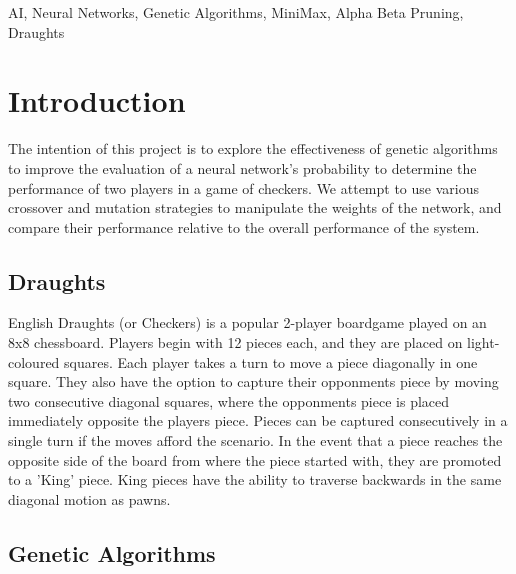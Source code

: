 \documentclass[12pt,a4paper]{article}
\begin{document}
\begin{keywords}
AI, Neural Networks, Genetic Algorithms, MiniMax, Alpha Beta Pruning, Draughts

\end{keywords}





\section{Introduction}
The intention of this project is to explore the effectiveness of genetic algorithms to improve the evaluation of a neural network's probability to determine the performance of two players in a game of checkers. We attempt to use various crossover and mutation strategies to manipulate the weights of the network, and compare their performance relative to the overall performance of the system.

\subsection*{Draughts}

English Draughts (or Checkers) is a popular 2-player boardgame played on an 8x8 chessboard. Players begin with 12 pieces each, and they are placed on light-coloured squares. Each player takes a turn to move a piece diagonally in one square. They also have the option to capture their opponments piece by moving two consecutive diagonal squares, where the opponments piece is placed immediately opposite the players piece. Pieces can be captured consecutively in a single turn if the moves afford the scenario. In the event that a piece reaches the opposite side of the board from where the piece started with, they are promoted to a 'King' piece. King pieces have the ability to traverse backwards in the same diagonal motion as pawns.

\subsection*{Genetic Algorithms}
\end{document}
